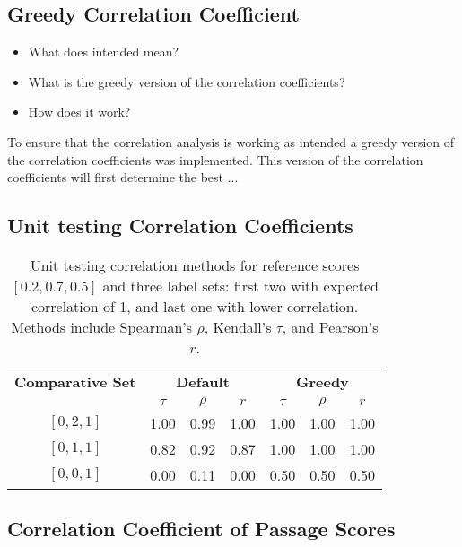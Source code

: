 \subsection{Greedy Correlation Coefficient}\label{greedy-correlation-coefficient}

\begin{itemize}
    \item What does intended mean?
    \item What is the greedy version of the correlation coefficients?
    \item How does it work?
\end{itemize}

To ensure that the correlation analysis is working as intended a greedy version of the correlation coefficients was implemented. This version of the correlation coefficients will first determine the best ...

\subsection{Unit testing Correlation Coefficients}\label{unit-testing-of-correlation-Coefficients}

\begin{table}[h!]
    \centering
    \caption{
        Unit testing correlation methods for reference scores $[0.2, 0.7, 0.5]$ and three label sets: first two with expected correlation of 1, and last one with lower correlation. Methods include Spearman's $\rho$, Kendall's $\tau$, and Pearson's $r$.
    }
    \begin{tabular}{ccccccc}
        \toprule
        \textbf{Comparative Set} & \multicolumn{3}{c}{\textbf{Default}} & \multicolumn{3}{c}{\textbf{Greedy}} \\
        \cmidrule(lr){2-4} \cmidrule(lr){5-7}
                                 & $\tau$ & $\rho$ & $r$ & $\tau$ & $\rho$ & $r$ \\
        \midrule
        
        $[0, 2, 1]$ & 1.00 & 0.99 & 1.00 & 1.00  & 1.00  & 1.00 \\
        $[0, 1, 1]$ & 0.82 & 0.92 & 0.87 & 1.00  & 1.00  & 1.00 \\
        $[0, 0, 1]$ & 0.00 & 0.11 & 0.00 & 0.50  & 0.50  & 0.50 \\
        \bottomrule
    \end{tabular}
\end{table}

\subsection{Correlation Coefficient of Passage Scores}\label{correlation-coefficient-of-passage-scores}

